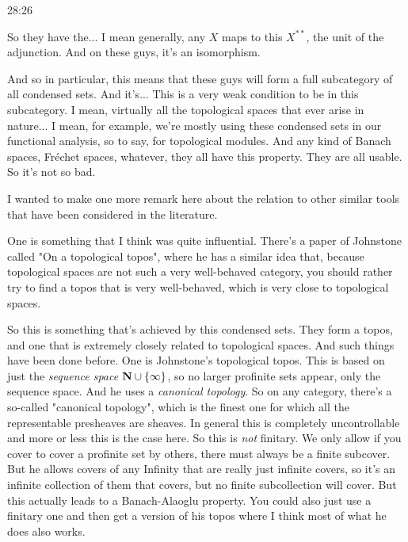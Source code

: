 \begin{example}
\begin{unfinished}{28:26}
\begin{remark}
So they have the... I mean generally, any $X$ maps to this $X^{**}$, the unit of the adjunction. And on these guys, it's an isomorphism.

And so in particular, this means that these guys will form a full subcategory of all condensed sets. And it's... This is a very weak condition to be in this subcategory. I mean, virtually all the topological spaces that ever arise in nature... I mean, for example, we're mostly using these condensed sets in our functional analysis, so to say, for topological modules. And any kind of Banach spaces, Fréchet spaces, whatever, they all have this property. They are all usable. So it's not so bad.


\begin{remark}
I wanted to make one more remark here about the relation to other similar tools that have been considered in the literature.

One is something that I think was quite influential. There's a paper of Johnstone called "On a topological topos", \citeme{} where he has a similar idea that, because topological spaces are not such a very well-behaved category, you should rather try to find a topos that is very well-behaved, which is very close to topological spaces.


So this is something that's achieved by this condensed sets. They form a topos, and one that is extremely closely related to topological spaces. And such things have been done before. One is Johnstone's topological topos. This is based on just the \emph{sequence space} $\mathbf N \cup \{\infty\}$, so no larger profinite sets appear, only the sequence space.
And he uses a \emph{canonical topology}. So on any category, there's a so-called "canonical topology", which is the finest one for which all the representable presheaves are sheaves. %
In general this is completely uncontrollable and more or less this is the case here. So this is \emph{not} finitary. We only allow if you cover to cover a  profinite set by others, there must always be a finite subcover. But he allows covers of any 
Infinity that are really just infinite covers, so it's an infinite collection of them that covers, but no finite subcollection will cover. But this actually leads to a Banach-Alaoglu property.
You could also just use a finitary one and then get a version of his topos where I think most of what he does also works. 


\end{remark}
\end{remark}
\end{unfinished}
\end{example}
